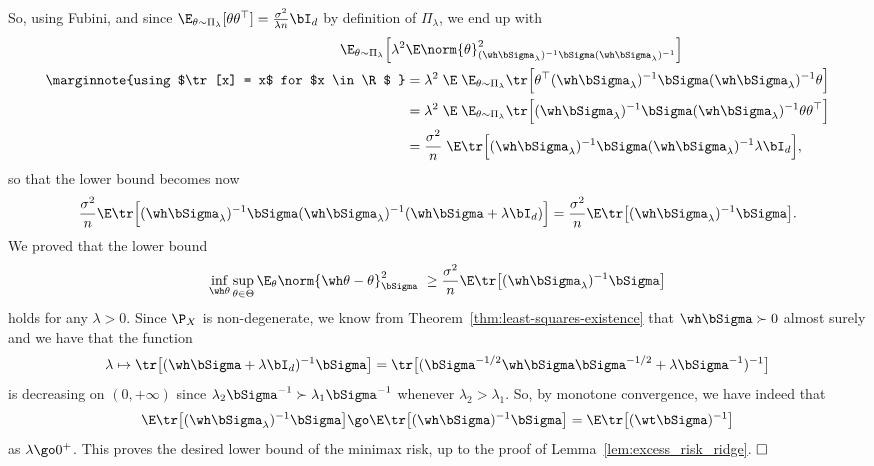 So, using Fubini, and since $\E_{\theta \sim \Pi_\lambda} [\theta \theta^\top] = \frac{\sigma^2}{\lambda n} \bI_d$ by definition of $\Pi_\lambda$, we end up with
\begin{align*}
	\E_{\theta \sim \Pi_\lambda} \Big[ \lambda^2 & \E \norm{\theta}_{(\wh \bSigma_\lambda)^{-1} 
	\bSigma (\wh \bSigma_\lambda)^{-1}}^2 \Big] \\
	\marginnote{using $\tr[x] = x$ for $x \in \R$ }
	&= \lambda^2 \; \E \; \E_{\theta \sim \Pi_\lambda} \tr \Big[ \theta^\top (\wh \bSigma_\lambda)^{-1} \bSigma (\wh \bSigma_\lambda)^{-1} \theta \Big] \\
	&= \lambda^2 \; \E \; \E_{\theta \sim \Pi_\lambda} \tr \Big[(\wh \bSigma_\lambda)^{-1} \bSigma (\wh \bSigma_\lambda)^{-1} \theta \theta^\top \Big] \\
	&= \frac{\sigma^2}{n} \; \E \tr \Big[(\wh \bSigma_\lambda)^{-1} \bSigma (\wh \bSigma_\lambda)^{-1}
	\lambda \bI_d \Big],
\end{align*}
so that the lower bound becomes now
\begin{equation*}
	\frac{\sigma^2}{n} \E \tr \Big[ (\wh \bSigma_\lambda)^{-1} \bSigma (\wh \bSigma_\lambda)^{-1} (\wh \bSigma + \lambda \bI_d) \Big] = \frac{\sigma^2}{n} \E \tr \big[ (\wh \bSigma_\lambda)^{-1} \bSigma \big].
\end{equation*}
We proved that the lower bound
\begin{equation*}
	\inf_{\wh \theta} \sup_{\theta \in \Theta} \E_\theta \norm{\wh \theta - \theta}_{\bSigma}^2 \geq
	\frac{\sigma^2}{n} \E \tr \big[ (\wh \bSigma_\lambda)^{-1} \bSigma \big]
\end{equation*}
holds for any $\lambda > 0$.
Since $\P_X$ is non-degenerate, we know from Theorem~\ref{thm:least-squares-existence} that $\wh \bSigma \succ 0$ almost surely and we have that the function 
\begin{equation*}
	\lambda \mapsto \tr \big[ (\wh \bSigma + \lambda \bI_d)^{-1} \bSigma \big] 
	= \tr \big[ (\bSigma^{-1/2} \wh \bSigma \bSigma^{-1/2} + \lambda \bSigma^{-1})^{-1} \big]
\end{equation*}
is decreasing on $(0, +\infty)$ since $\lambda_2 \bSigma^{-1} \succ \lambda_1 \bSigma^{-1}$ whenever $\lambda_2 > \lambda_1$.
So, by monotone convergence, we have indeed that
\begin{equation*}
	\E \tr \big[ (\wh \bSigma_\lambda)^{-1} \bSigma \big] \go 
	\E \tr \big[ (\wh \bSigma)^{-1} \bSigma \big] = \E \tr \big[ (\wt \bSigma)^{-1} \big]
\end{equation*}
as $\lambda \go 0^+$.
This proves the desired lower bound of the minimax risk, up to the proof of Lemma~\ref{lem:excess_risk_ridge}. $\hfill \square$

